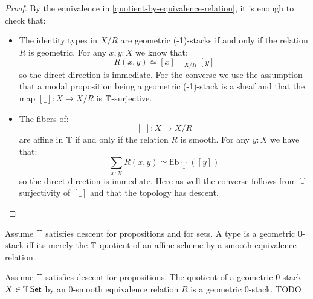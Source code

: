 \documentclass{article}
\begin{document}
\begin{proof}
By the equivalence in \ref{quotient-by-equivalence-relation}, it is enough to check that:
\begin{itemize}
\item The identity types in $X/R$ are 
geometric (-1)-stacks if and only if the relation $R$ is geometric. For any $x,y:X$ we know that:
\[R(x,y) \simeq [x] =_{X/R}[y]\]
so the direct direction is immediate. For the converse we use the assumption that a modal proposition being a geometric (-1)-stack is a sheaf and that the map $[\_]:X\to X/R$ is $\mathbb{T}$-surjective.
\item The fibers of: 
\[[\_]:X\to X/R\] 
are affine in $\mathbb{T}$ if and only if the relation $R$ is smooth. For any $y:X$ we have that:
\[\sum_{x:X} R(x,y) \simeq \mathrm{fib}_{[\_]}([y])\]
so the direct direction is immediate. Here as well the converse follows from $\mathbb{T}$-surjectivity of $[\_]$ and that the topology has descent.
\end{itemize}
\end{proof}
\begin{corollary}
    Assume $\mathbb{T}$ satisfies descent for propositions and for sets.
    A type is a geometric 0-stack iff its merely the $\mathbb{T}$-quotient of an affine scheme by a smooth equivalence relation.
\end{corollary}
\begin{theorem}{\label{thm:QuotientOfAlgebraicSpace}}
    Assume $\mathbb{T}$ satisfies descent for propositions. 
    The quotient of a geometric $0$-stack $X \in \mathbb{T} \operatorname{\mathsf {Set}}$ by an $0$-smooth equivalence relation $R$ is a geometric $0$-stack. TODO
\end{theorem}
\end{document}
